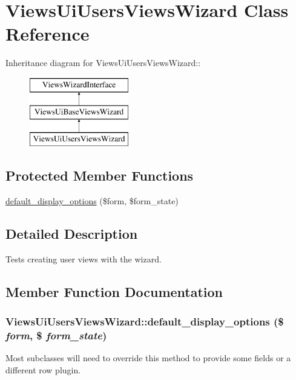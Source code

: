 \hypertarget{classViewsUiUsersViewsWizard}{
\section{ViewsUiUsersViewsWizard Class Reference}
\label{classViewsUiUsersViewsWizard}
}
Inheritance diagram for ViewsUiUsersViewsWizard::\begin{figure}[H]
\begin{center}
\leavevmode
\includegraphics[height=3cm]{classViewsUiUsersViewsWizard}
\end{center}
\end{figure}
\subsection*{Protected Member Functions}
\begin{DoxyCompactItemize}
\item 
\hyperlink{classViewsUiUsersViewsWizard_ac9649ee6a7b0234dc1f7d78948ac1285}{default\_\-display\_\-options} (\$form, \$form\_\-state)
\end{DoxyCompactItemize}


\subsection{Detailed Description}
Tests creating user views with the wizard. 

\subsection{Member Function Documentation}
\hypertarget{classViewsUiUsersViewsWizard_ac9649ee6a7b0234dc1f7d78948ac1285}{
\subsubsection[{default\_\-display\_\-options}]{\setlength{\rightskip}{0pt plus 5cm}ViewsUiUsersViewsWizard::default\_\-display\_\-options (\$ {\em form}, \/  \$ {\em form\_\-state})}}
\label{classViewsUiUsersViewsWizard_ac9649ee6a7b0234dc1f7d78948ac1285}
Most subclasses will need to override this method to provide some fields or a different row plugin. 

